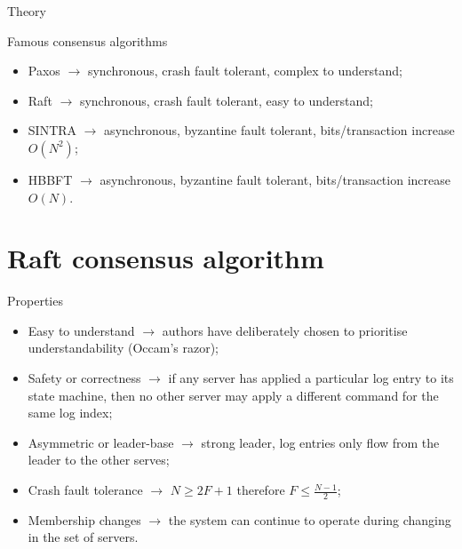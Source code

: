 \documentclass[presentation]{beamer}\mode<presentation>{\usetheme{AMSBolognaFC}}
\begin{document}
\begin{frame}[allowframebreaks]{Theory}
    \framebreak

    \begin{block}{Famous consensus algorithms}
        \begin{itemize}
            \item Paxos \cite{paxos} $\rightarrow$ synchronous, crash fault tolerant, complex to understand;
            \item Raft \cite{raft} $\rightarrow$ synchronous, crash fault tolerant, easy to understand;
            \item SINTRA \cite{sintra} $\rightarrow$ asynchronous, byzantine fault tolerant, bits/transaction increase $O(N^2)$;
            \item HBBFT \cite{hbbft} $\rightarrow$  asynchronous, byzantine fault tolerant, bits/transaction increase $O(N)$.
        \end{itemize}
    \end{block}
\end{frame}

\section{Raft consensus algorithm}

\begin{frame}{Properties}
    \begin{itemize}
        \item Easy to understand $\rightarrow$ authors have deliberately chosen to prioritise understandability (Occam's razor);
        \item Safety or correctness $\rightarrow$ if any server has applied a particular log entry to its state machine, then no other server may apply a different command for the same log index;
        \item Asymmetric or leader-base $\rightarrow$ strong leader, log entries only flow from the leader to the other serves;
        \item Crash fault tolerance $\rightarrow$ $N \ge 2F + 1$ therefore $F \le \frac{N - 1}{2}$;
        \item Membership changes $\rightarrow$ the system can continue to operate during changing in the set of servers.
    \end{itemize}
\end{frame}
\end{document}
